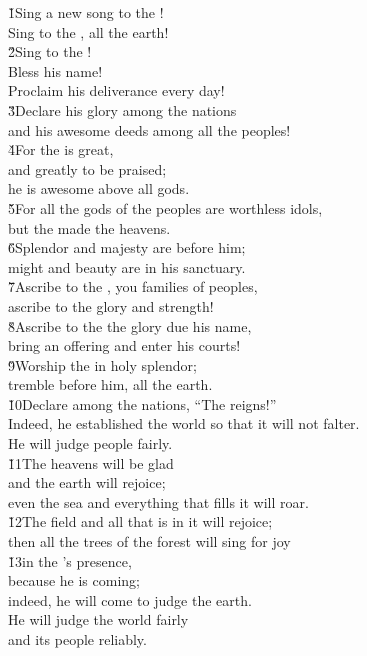 \begin{poetry}
\poeml \v{1}Sing a new song to the ! \\
\poemll    Sing to the , all the earth! \\
\poeml \v{2}Sing to the ! \\
\poemll    Bless his name! \\
\poemlll       Proclaim his deliverance every day! \\
\poeml \v{3}Declare his glory among the nations \\
\poemll    and his awesome deeds among all the peoples! \\
\poeml \v{4}For the  is great, \\
\poemll    and greatly to be praised; \\
\poemlll       he is awesome above all gods. \\
\poeml \v{5}For all the gods of the peoples are worthless idols, \\
\poemll    but the  made the heavens. \\
\poeml \v{6}Splendor and majesty are before him; \\
\poemll    might and beauty are in his sanctuary. \\
\poeml \v{7}Ascribe to the , you families of peoples, \\
\poemll    ascribe to the  glory and strength! \\
\poeml \v{8}Ascribe to the  the glory due his name, \\
\poemll    bring an offering and enter his courts! \\
\poeml \v{9}Worship the  in holy splendor; \\
\poemll    tremble before him, all the earth. \\
\poeml \v{10}Declare among the nations, ``The  reigns!'' \\
\poemll    Indeed, he established the world so that it will not falter. \\
\poemlll       He will judge people fairly. \\
\poeml \v{11}The heavens will be glad \\
\poemll    and the earth will rejoice; \\
\poemlll       even the sea and everything that fills it will roar. \\
\poeml \v{12}The field and all that is in it will rejoice; \\
\poemll    then all the trees of the forest will sing for joy \\
\poeml \v{13}in the 's presence, \\
\poeml because he is coming; \\
\poemll    indeed, he will come to judge the earth. \\
\poeml He will judge the world fairly \\
\poemll    and its people reliably.
\end{poetry}

